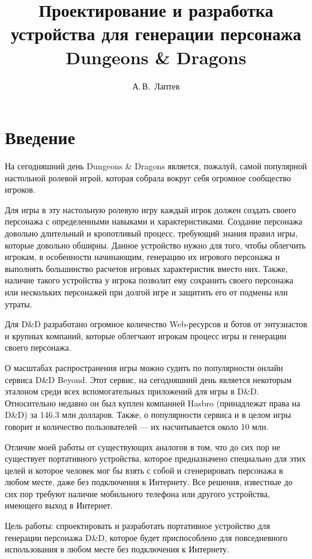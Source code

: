 \documentclass{altsu-bachelor}
\title{Проектирование и разработка устройства для генерации персонажа Dungeons \& Dragons}
\author{А.\,В.~Лаптев}
\institute{Институт цифровых технологий, электроники и физики}
\date{\the\year}
\begin{document}
\maketitle

\setcounter{page}{2}
\makeabstract
\tableofcontents

\chapter*{Введение}

На сегодняшний день Dungeons \& Dragons является, пожалуй, самой популярной настольной ролевой игрой, которая собрала вокруг себя огромное сообщество игроков.

Для игры в эту настольную ролевую игру каждый игрок должен создать своего персонажа с определенными навыками и характеристиками. Создание персонажа довольно длительный и кропотливый процесс, требующий знания правил игры, которые довольно обширны. Данное устройство нужно для того, чтобы облегчить игрокам, в особенности начинающим, генерацию их игрового персонажа и выполнять большинство расчетов игровых характеристик вместо них. Также, наличие такого устройства у игрока позволит ему сохранить своего персонажа или нескольких персонажей при долгой игре и защитить его от подмены или утраты.

Для D\&D разработано огромное количество Web-ресурсов и ботов от энтузиастов и крупных компаний, которые облегчают игрокам процесс игры и генерации своего персонажа.

О масштабах распространения игры можно судить по популярности онлайн сервиса D\&D Beyond. Этот сервис, на сегодняшний день является некоторым эталоном среди всех вспомогательных приложений для игры в D\&D. Относительно недавно он был куплен компанией Hasbro (принадлежат права на D\&D) за 146.3 млн долларов. Также, о популярности сервиса и в целом игры говорит и количество пользователей --- их насчитывается около 10 млн.

Отличие моей работы от существующих аналогов в том, что до сих пор не существует портативного устройства, которое предназначено специально для этих целей и которое человек мог бы взять с собой и сгенерировать персонажа в любом месте, даже без подключения к Интернету. Все решения, известные до сих пор требуют наличие мобильного телефона или другого устройства, имеющего выход в Интернет.

Цель работы: спроектировать и разработать портативное устройство для генерации персонажа D\&D, которое будет приспособлено для повседневного использования в любом месте без подключения к Интернету.
\end{document}
